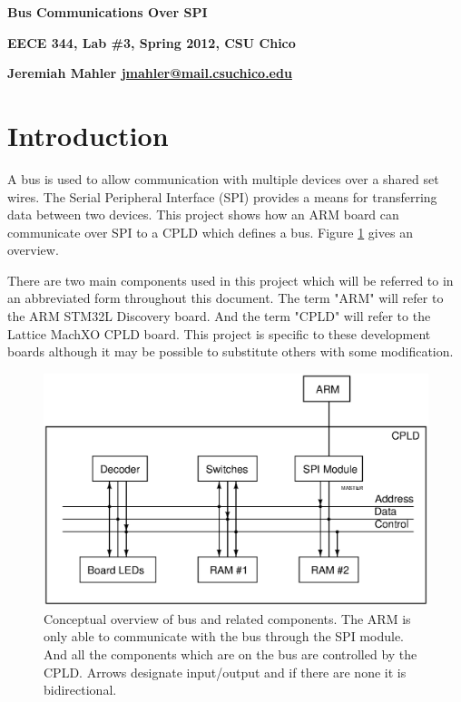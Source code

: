 \documentclass{article}
\begin{document}

\centerline{\Large \textbf{Bus Communications Over SPI}}
\vspace{2em}
\centerline{\small \textbf{EECE 344, Lab \#3, Spring 2012, CSU Chico}}
\vspace{0.5em}
\centerline{\small \textbf{Jeremiah Mahler \href{mailto:jmahler@mail.csuchico.edu}{jmahler@mail.csuchico.edu}}}
\vspace{2em}





\section{Introduction}

A bus is used to allow communication with multiple devices
over a shared set wires.
The Serial Peripheral Interface (SPI) provides a means
for transferring data between two devices.
This project shows how an ARM board can communicate over
SPI to a CPLD which defines a bus.
Figure \ref{fig:bus} gives an overview.

There are two main components used in this project which
will be referred to in an abbreviated form throughout this document.
The term "ARM" will refer to the ARM STM32L Discovery\cite{UM1079} board.
And the term "CPLD" will refer to the Lattice MachXO\cite{EB66}
CPLD board.
This project is specific to these development boards although it
may be possible to substitute others with some modification.

\begin{figure}[hbp]
\center
\includegraphics[scale=0.7]{figures/schematics/BUS}
\caption{Conceptual overview of bus and related components.
The ARM is only able to communicate with the bus through the SPI
module.
And all the components which are on the bus are controlled by the
CPLD.
Arrows designate input/output and if there are none it is bidirectional.
}
\label{fig:bus}
\end{figure}
\end{document}
